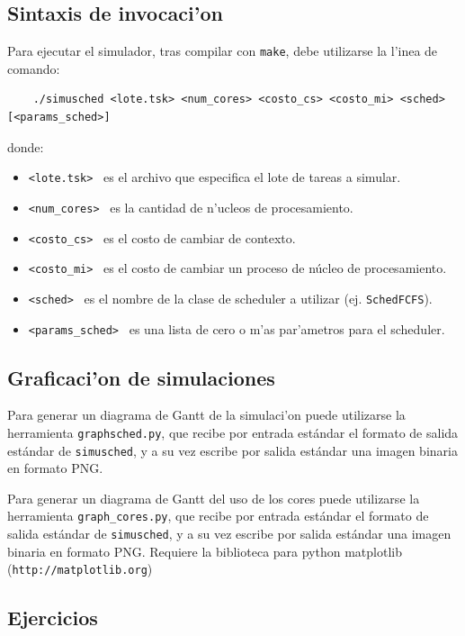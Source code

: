 \documentclass[a4paper,11pt]{article}
\begin{document}
\subsection*{Sintaxis de invocaci'on}

Para ejecutar el simulador, tras compilar con \texttt{make}, debe utilizarse la l'inea de comando:
\begin{verbatim}
    ./simusched <lote.tsk> <num_cores> <costo_cs> <costo_mi> <sched> [<params_sched>]
\end{verbatim}
\noindent donde:
\begin{itemize}
        \item \texttt{<lote.tsk>} \ es el archivo que especifica el lote de tareas a simular.
        \item \texttt{<num\_cores>} \ es la cantidad de n'ucleos de procesamiento.
        \item \texttt{<costo\_cs>} \ es el costo de cambiar de contexto.
         \item \texttt{<costo\_mi>} \ es el costo de cambiar un proceso de núcleo de procesamiento.
        \item \texttt{<sched>} \ es el nombre de la clase de scheduler a utilizar (ej. \texttt{SchedFCFS}).
        \item \texttt{<params\_sched>}  \ es una lista de cero o m'as par'ametros para el scheduler.
\end{itemize}


\subsection*{Graficaci'on de simulaciones}

Para generar un diagrama de Gantt de la simulaci'on puede utilizarse la herramienta
\texttt{graphsched.py}, que recibe por entrada estándar el formato de salida estándar
de \texttt{simusched}, y a su vez escribe por salida estándar una imagen binaria en formato PNG.

Para generar un diagrama de Gantt del uso de los cores puede utilizarse la herramienta
\texttt{graph\_cores.py}, que recibe por entrada estándar el formato de salida estándar
de \texttt{simusched}, y a su vez escribe por salida estándar una imagen binaria en formato PNG.
Requiere la biblioteca para python matplotlib (\texttt{http://matplotlib.org})


\subsection*{Ejercicios}
\end{document}
